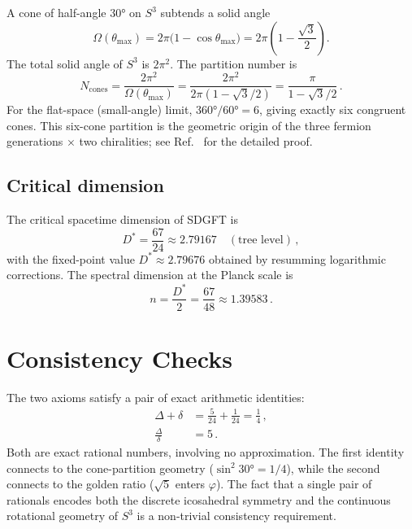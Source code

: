 \documentclass[amsmath,amssymb,aps,prd,twocolumn,superscriptaddress,nofootinbib]{revtex4-2}
\begin{document}
A cone of half-angle $30°$ on $S^3$ subtends a solid angle
\begin{equation}\label{eq:solidangle}
  \Omega(\theta_{\max}) = 2\pi\bigl(1 - \cos\theta_{\max}\bigr)
  = 2\pi\!\left(1 - \frac{\sqrt{3}}{2}\right).
\end{equation}
The total solid angle of $S^3$ is $2\pi^2$.  The partition number is
\begin{equation}\label{eq:partition}
  N_{\text{cones}} = \frac{2\pi^2}{\Omega(\theta_{\max})}
  = \frac{2\pi^2}{2\pi(1 - \sqrt{3}/2)} = \frac{\pi}{1 - \sqrt{3}/2}\,.
\end{equation}
For the flat-space (small-angle) limit, $360°/60° = 6$, giving exactly six
congruent cones.  This six-cone partition is the geometric origin of the three
fermion generations $\times$ two chiralities; see Ref.~\cite{Besemer2026_03}
for the detailed proof.

\subsection{Critical dimension}

The critical spacetime dimension of SDGFT is
\begin{equation}\label{eq:Dstar}
  D^* = \frac{67}{24} \approx 2.79167 \quad(\text{tree level})\,,
\end{equation}
with the fixed-point value $D^* \approx 2.79676$ obtained by resumming
logarithmic corrections.  The spectral dimension at the Planck scale is
\begin{equation}\label{eq:spectral}
  n = \frac{D^*}{2} = \frac{67}{48} \approx 1.39583\,.
\end{equation}

\section{Consistency Checks}\label{sec:checks}

The two axioms satisfy a pair of exact arithmetic identities:
\begin{align}
  \Delta + \delta &= \frac{5}{24} + \frac{1}{24}
                   = \frac{1}{4}\,,\label{eq:check1}\\[4pt]
  \frac{\Delta}{\delta} &= 5\,.\label{eq:check2}
\end{align}
Both are exact rational numbers, involving no approximation.  The first
identity connects to the cone-partition geometry ($\sin^2 30° = 1/4$), while
the second connects to the golden ratio ($\sqrt{5}$ enters $\varphi$).  The
fact that a single pair of rationals encodes both the discrete icosahedral
symmetry and the continuous rotational geometry of $S^3$ is a non-trivial
consistency requirement.
\end{document}
